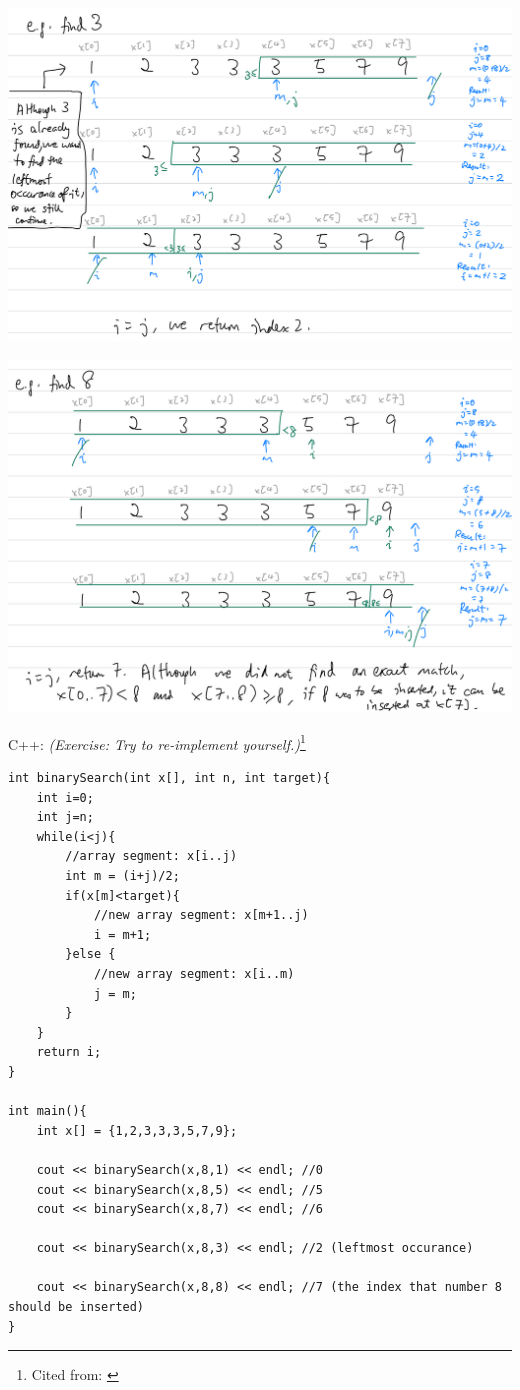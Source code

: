 \includegraphics[width=14cm]{images/ch7-binarysearch3.png}

\includegraphics[width=14cm]{images/ch7-binarysearch8.png}

\pagebreak

C++: \textit{(Exercise:  Try to re-implement yourself.)}\footnote{Cited from: \cite{ip:binsearch}}

\begin{lstlisting}
int binarySearch(int x[], int n, int target){
    int i=0;
    int j=n;
    while(i<j){
        //array segment: x[i..j)
        int m = (i+j)/2;
        if(x[m]<target){
            //new array segment: x[m+1..j)
            i = m+1;
        }else {
            //new array segment: x[i..m)
            j = m;
        }
    }
    return i;
}

int main(){
    int x[] = {1,2,3,3,3,5,7,9};

    cout << binarySearch(x,8,1) << endl; //0
    cout << binarySearch(x,8,5) << endl; //5
    cout << binarySearch(x,8,7) << endl; //6

    cout << binarySearch(x,8,3) << endl; //2 (leftmost occurance)

    cout << binarySearch(x,8,8) << endl; //7 (the index that number 8 should be inserted)
}
\end{lstlisting}

